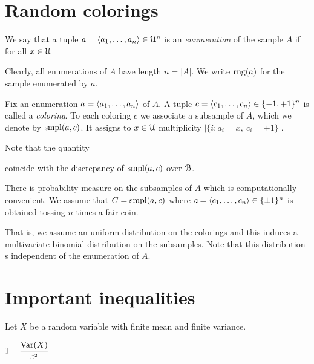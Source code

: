 \documentclass[sputnik.tex]{subfiles}
\begin{document}
\section{Random colorings}\label{colorings}

We say that a tuple $a=\langle a_1,\dots,a_n\rangle\in\EuScript U^n$ is an \emph{enumeration\/} of the sample $A$ if for all $x\in\EuScript U$


Clearly, all enumerations of $A$ have length $n=|A|$. We write \emph{$\mathop{\rm rng}(a)$} for the sample enumerated by $a$.

\def\spl{{\rm smpl}}

Fix an enumeration $a=\langle a_1,\dots,a_n\rangle$ of $A$. A tuple $c=\langle c_1,\dots,c_n\rangle\in\{-1,+1\}^n$ is called a \emph{coloring}. To each coloring $c$ we associate a subsample of $A$, which we denote by \emph{$\spl(a,c) $}. It assigns to $x\in\EuScript U$ multiplicity $\big|\{i : a_i=x,\ c_i=+1\}\big|$.

Note that the quantity 


coincide with the discrepancy of $\spl(a,c)$ over $\EuScript B$.

There is probability measure on the subsamples of $A$ which is computationally convenient. We assume that $C=\spl(a,c)$ where $c=\langle c_1,\dots,c_n\rangle\in\{\pm1\}^n$ is obtained tossing $n$ times a fair coin. 

That is, we assume an uniform distribution on the colorings and this induces a multivariate binomial distribution on the subsamples. Note that this distribution s independent of the enumeration of $A$.


\section{Important inequalities}


\def\ceq#1#2#3{\parbox[t]{15ex}{$\displaystyle #1$}\medrel{#2}{$\displaystyle #3$}}

\begin{void_thm}\label{wlln}
Let $X$ be a random variable with finite mean and finite variance.

\ceq{\hfill1-\frac{{\rm Var}(X)}{\epsilon^{\scriptscriptstyle 2}}}{<}{\displaystyle\Pr \Big(\big|{\rm E}(X)-X\big|\le\epsilon\Big)}
\end{void_thm}
\end{document}
